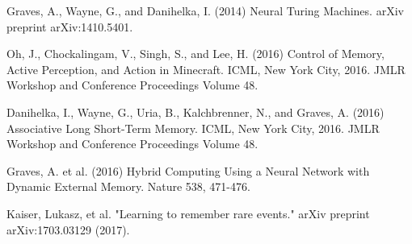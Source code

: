 \documentclass{article}
\begin{document}
\begin{thebibliography}{plain}
Graves, A., Wayne, G., and Danihelka, I. (2014) Neural Turing Machines. arXiv preprint arXiv:1410.5401.

Oh, J., Chockalingam, V., Singh, S., and Lee, H. (2016) Control of Memory, Active Perception, and Action in Minecraft. ICML, New York City, 2016. JMLR Workshop and Conference Proceedings Volume 48.

Danihelka, I., Wayne, G., Uria, B., Kalchbrenner, N., and Graves, A. (2016) Associative Long Short-Term Memory. ICML, New York City, 2016. JMLR Workshop and Conference Proceedings Volume 48.

Graves, A. et al. (2016) Hybrid Computing Using a Neural Network with Dynamic External Memory. Nature 538, 471-476.

Kaiser, Lukasz, et al. "Learning to remember rare events." arXiv preprint arXiv:1703.03129 (2017).
\end{thebibliography}
\end{document}
